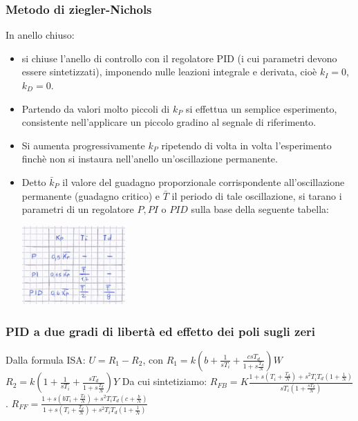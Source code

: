 \begin{landscape}
\begin{multicols*}{3}
    \subsubsection*{Metodo di ziegler-Nichols}
    In anello chiuso:
    \begin{itemize}
        \item si chiuse l'anello di controllo con il regolatore PID (i cui parametri devono essere sintetizzati), imponendo nulle leazioni integrale e derivata, cioè $k_I = 0$, $k_D = 0$.
        \item Partendo da valori molto piccoli di $k_P$ si effettua un semplice esperimento, consistente nell'applicare un piccolo gradino al segnale di riferimento.
        \item Si aumenta progressivamente $k_P$ ripetendo di volta in volta l'esperimento finchè non si instaura nell'anello un'oscillazione permanente.
        \item Detto $\bar{k}_P$ il valore del guadagno proporzionale corrispondente all'oscillazione permanente (guadagno critico) e $\bar{T}$ il periodo di tale oscillazione, si tarano i parametri di un regolatore $P, PI$ o $PID$ sulla base della seguente tabella:
        \begin{center}
            \includegraphics[height=3cm]{../formulario/img7.JPG}
        \end{center}
    \end{itemize}
    \subsubsection*{PID a due gradi di libertà ed effetto dei poli sugli zeri}
    Dalla formula ISA:\newline
    $U = R_1 - R_2$, con \newline
    $R_1 = k \left( b + \frac{1}{sT_i} + \frac{c s T_d}{1 + s \frac{T_d}{N}} \right) W$\newline
    $R_2 = k\left( 1 + \frac{1}{sT_i} + \frac{sT_d}{1 + s \frac{T_d}{N}} \right)Y$\newline
    \newline
    Da cui sintetiziamo:\newline
    $R_{FB} = K \frac{1 + s\left(T_i + \frac{T_d}{N}\right) + s^2 T_i T_d \left(1 + \frac{1}{N}\right)}{sT_i \left( 1 + \frac{sT_d}{N}\right)}$.\newline
    $R_{FF} = \frac{1+ s\left(bT_i + \frac{T_d}{N}\right) + s^2 T_i T_d \left(c + \frac{b}{N}\right)}{1 + s \left( T_i + \frac{T_d}{N} \right) + s^2 T_i T_d \left( 1 + \frac{1}{N} \right)}$
    \end{multicols*}
\end{landscape}